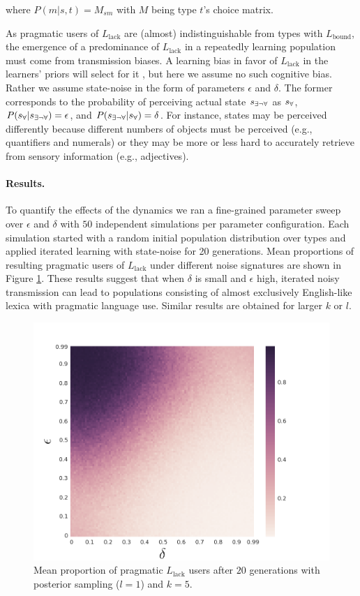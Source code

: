 \documentclass[10pt,a4paper]{article}
\newcommand{\state}{\ensuremath{s}\xspace}		%
\newcommand{\mystate}[1]{\ensuremath{\state_{\text{#1}}}\xspace} %
\newcommand{\ssome}{\mystate{\ensuremath{\exists\neg\forall}}}
\newcommand{\sall}{\mystate{\ensuremath{\forall}}}
\begin{document}
\noindent where $P(m|s,t) = M_{sm}$ with $M$ being type $t$'s choice matrix.

As pragmatic users of $L_\text{lack}$ are (almost) indistinguishable from types with
$L_\text{bound}$, the emergence of a predominance of $L_\text{lack}$ in a repeatedly learning
population must come from transmission biases. A learning bias in favor of $L_\text{lack}$ in
the learners' priors will select for it \citep{brochhagen+etal:2016:CogSci}, but here we assume
no such cognitive bias. Rather we assume state-noise in the form of parameters $\epsilon$ and
$\delta$. The former corresponds to the probability of perceiving actual state $\ssome$ as
$\sall$, $P(\sall | \ssome) = \epsilon$, and $P(\ssome | \sall) = \delta$. For instance, states
may be perceived differently because different numbers of objects must be perceived (e.g.,
quantifiers and numerals) or they may be more or less hard to accurately retrieve from sensory
information (e.g., adjectives).


\paragraph{Results.} To quantify the effects of the dynamics we ran a fine-grained parameter
sweep over $\epsilon$ and $\delta$ with $50$ independent simulations per parameter
configuration. Each simulation started with a random initial population distribution over types
and applied iterated learning with state-noise for 20 generations. Mean proportions of resulting
pragmatic users of $L_{\text{lack}}$ under different noise signatures are shown in Figure
\ref{fig:quant}. These results suggest that when $\delta$ is small and $\epsilon$ high, iterated noisy transmission can
lead to populations consisting of almost exclusively English-like lexica with pragmatic
language use. Similar results are obtained for larger $k$ or $l$.

\begin{figure}[ht]
\centering
    \includegraphics[scale=0.33]{../code/plots/quantifiers-posterior-sampling-k5.png}
  \caption{Mean proportion of pragmatic $L_{\text{lack}}$ users after $20$ generations with posterior sampling ($l = 1$) and $k = 5$.}
  \label{fig:quant}
\end{figure}
\end{document}
